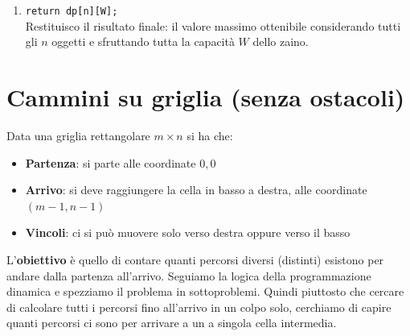\begin{enumerate}
     massimo dalla funzione \texttt{fmax} rispetto al valore che avremmo ottenuto prendendo l'oggetto. Siccome non prendiamo l'oggetto l'indice $w$ rimane invariato, in quanto il peso corrente non cambia.\smallskip\\
     Invece se prendiamo l'oggetto, impostiamo che \texttt{d[i][w] = dp[i-1][w-peso[i-1]] + valore[i-1]}. Siccome stiamo prendendo l'oggetto, dobbiamo considerare due cose: la prima è aggiungere il valore dell'oggetto che 
     prendiamo, e questo lo facciamo sommando \texttt{valore[i-1]}, la seconda è che ora il peso disponibile diminuisce visto che abbiamo preso l'oggetto e quindi dobbiamo sottrarre alla capacità corrente (\texttt{w}) il
    peso dell'oggetto che prendiamo (\texttt{peso[i-1]}), quindi scriviamo \texttt{w-peso[i-1]}.
    \item \texttt{return dp[n][W];}\\
    Restituisco il risultato finale: il valore massimo ottenibile considerando tutti gli $n$ oggetti e sfruttando tutta la capacità $W$ dello zaino.
\end{enumerate}


\section{Cammini su griglia (senza ostacoli)}
Data una griglia rettangolare $m \times n$ si ha che:
\begin{itemize}
    \item \textbf{Partenza}: si parte alle coordinate $0,0$
    \item \textbf{Arrivo}: si deve raggiungere la cella in basso a destra, alle coordinate $(m-1,n-1)$
    \item \textbf{Vincoli}: ci si può muovere solo verso destra oppure verso il basso 
\end{itemize}
L'\textbf{obiettivo} è quello di contare quanti percorsi diversi (distinti) esistono per andare dalla partenza all'arrivo. 
Seguiamo la logica della programmazione dinamica e spezziamo il problema in sottoproblemi. Quindi piuttosto che cercare di calcolare 
tutti i percorsi fino all'arrivo in un colpo solo, cerchiamo di capire quanti percorsi ci sono per arrivare a un a singola cella intermedia.\smallskip\\

